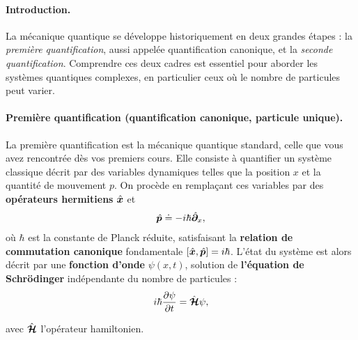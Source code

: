 \paragraph{Introduction.}

La mécanique quantique se développe historiquement en deux grandes étapes : la \emph{première quantification}, aussi appelée quantification canonique, et la \emph{seconde quantification}. Comprendre ces deux cadres est essentiel pour aborder les systèmes quantiques complexes, en particulier ceux où le nombre de particules peut varier.




\paragraph{Première quantification (quantification canonique, particule unique).}

La première quantification est la mécanique quantique standard, celle que vous avez rencontrée dès vos premiers cours. Elle consiste à quantifier un système classique décrit par des variables dynamiques telles que la position $x$ et la quantité de mouvement $p$. On procède en remplaçant ces variables par des {\bf opérateurs hermitiens} $\hat{\bm{x}}$ et %
\begin{eqnarray}
	\hat{\bm{p}} \doteq -i\hbar \hat{\bm{\partial}}_x,	\label{chap.1.rapel.1}
\end{eqnarray}
où $\hbar$ est la constante de Planck réduite, satisfaisant la {\bf relation de commutation canonique} fondamentale $[\hat{\bm{x}}, \hat{\bm{p}}] = i\hbar$. L’état du système est alors décrit par une {\bf fonction d’onde} $\psi(x,t)$, solution de {\bf l’équation de  Schrödinger} indépendante du nombre de particules :
\begin{eqnarray}
\quad i \hbar \frac{\partial \psi }{\partial t}  &= \hat{\bm{\mathcal{H}}} \psi,\label{chap.1.rapel.2}
\end{eqnarray}

avec $\hat{\bm{\mathcal{H}}}$ l’opérateur hamiltonien. 

